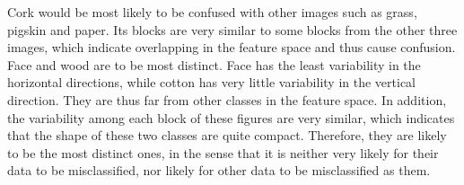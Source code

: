\label{sec:features}
Cork would be most likely to be confused with other images such as grass, pigskin and paper. Its blocks are very similar to some blocks from the other three images, which indicate overlapping in the feature space and thus cause confusion.
Face and wood are to be most distinct. Face has the least variability in the horizontal directions, while cotton has very little variability in the vertical direction. They are thus far from other classes in the feature space. In addition, the variability among each block of these figures are very similar, which indicates that the shape of these two classes are quite compact. Therefore, they are likely to be the most distinct ones, in the sense that it is neither very likely for their data to be misclassified, nor likely for other data to be misclassified as them.
